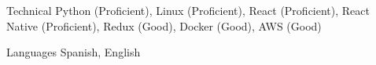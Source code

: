 
\begin{cvskills}

  \cvskill
  {Technical} %
  {Python (Proficient), Linux (Proficient), React (Proficient), React Native (Proficient), Redux (Good), Docker (Good), AWS (Good)} %





  \cvskill
  {Languages} %
  {Spanish, English} %

\end{cvskills}
